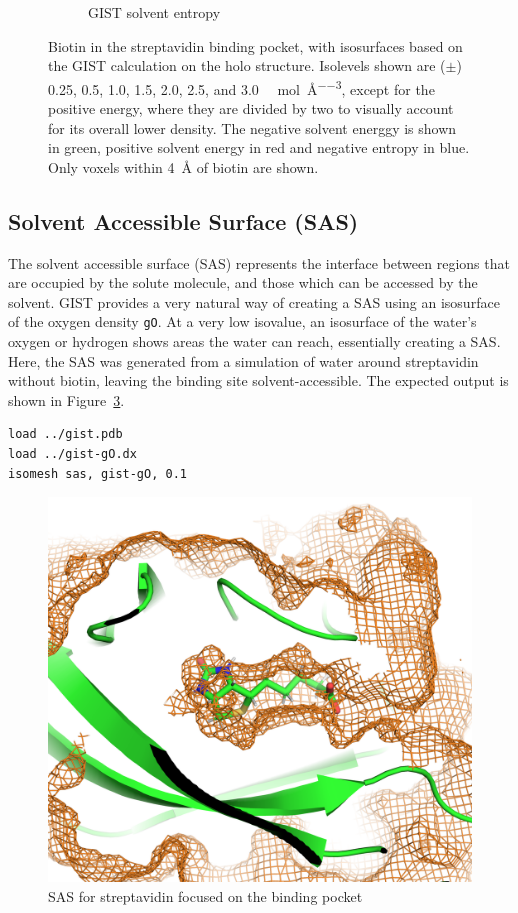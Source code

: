 \documentclass[9pt,tutorial]{livecoms}
\newcommand{\code}{\texttt}
\begin{document}
\begin{figure}
\begin{subfigure}[b]{0.45\textwidth}
		\caption{GIST solvent entropy}
		\label{fig-binding-pocket-entropy}
	\end{subfigure}
	\caption{Biotin in the streptavidin binding pocket, with isosurfaces based on the GIST calculation on the holo structure. 
	Isolevels shown are ($\pm$) 0.25, 0.5, 1.0, 1.5, 2.0, 2.5, and 3.0 \si{\kilo\calorie\per\mole\per\cubic\angstrom}, except for 
	the positive energy, where they are divided by two to visually account for its overall lower density. The negative solvent energgy is shown in green, positive solvent energy in red and negative entropy in blue. Only voxels within \SI{4}{\angstrom} of biotin are shown.}
	\label{fig-binding-pocket}
\end{figure}

\subsection{Solvent Accessible Surface (SAS)}
The solvent accessible surface (SAS) represents the interface between regions that are occupied by the solute molecule, and those which can be accessed by the solvent.
GIST provides a very natural way of creating a SAS using an isosurface of the oxygen density \code{gO}.
At a very low isovalue, an isosurface of the water's oxygen or hydrogen shows areas the water can reach, essentially creating a SAS. 
Here, the SAS was generated from a simulation of water around streptavidin without biotin, leaving the binding site solvent-accessible.
The expected output is shown in Figure~\ref{fig-streptavidin_sasa}.

\begin{lstlisting}[style=pymol]
load ../gist.pdb
load ../gist-gO.dx
isomesh sas, gist-gO, 0.1
\end{lstlisting}

\begin{figure}
	\centering
	\includegraphics[width=1\linewidth]{figures/sasa-simple.png}
	\caption{SAS for streptavidin focused on the binding pocket}\label{fig-streptavidin_sasa}
\end{figure}
\end{document}
